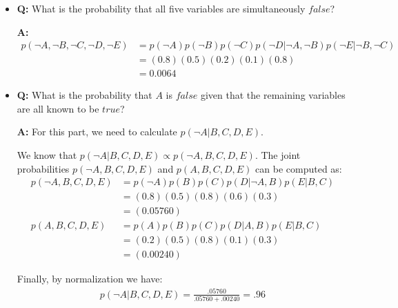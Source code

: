 \documentclass[11pt,letterpaper]{article}
\begin{document}
\begin{itemize}
\item \textbf{Q:} What is the probability that all five variables are simultaneously $false$? 

\begin{solution}
\textbf{A:}  
%
\begin{align*}
p(\neg A, \neg B, \neg C, \neg D, \neg E) &= p(\neg A) p(\neg B) p(\neg C) p(\neg D|\neg A, \neg B) p(\neg E | \neg B, \neg C)\\
&= (0.8)(0.5)(0.2)(0.1)(0.8)\\
&= 0.0064
\end{align*}
\end{solution}


\item \textbf{Q:} What is the probability that $A$ is $false$ given that the remaining variables are all known to be $true$? \\

\begin{solution}
\textbf{A:} For this part, we need to calculate $p(\neg A|B,C,D,E)$. 

We know that $p(\neg A|B,C,D,E) \propto p(\neg A,B,C,D,E)$. The joint probabilities $p(\neg A,B,C,D,E)$ and  $p(A,B,C,D,E)$ can be computed as:
%
\begin{align*}
p(\neg A,B,C,D,E) &= p(\neg A)p(B)p(C)p(D|\neg A,B)p(E|B,C)\\
&=(0.8)(0.5)(0.8)(0.6)(0.3) \\
&=(0.05760) \\
p(A,B,C,D,E)&= p(A)p(B)p(C)p(D| A,B)p(E|B,C)\\
&=(0.2)(0.5)(0.8)(0.1)(0.3)\\
&=(0.00240) 
\end{align*}

Finally, by normalization we have:
%
\begin{align*}
p(\neg A| B,C,D,E) = \frac{.05760}{.05760 +.00240} = .96
\end{align*}
\end{solution}
\end{itemize}
\end{document}
